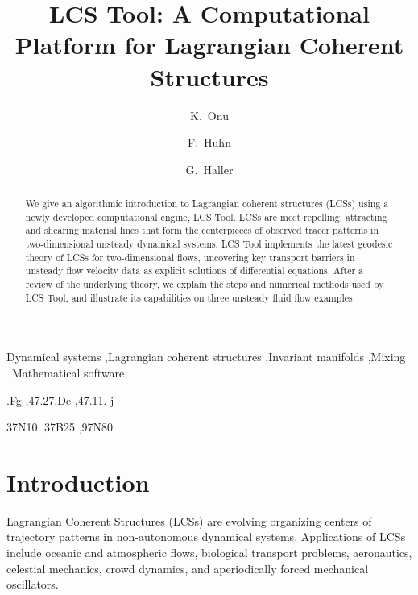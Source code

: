 \documentclass{elsarticle}
\begin{document}
\begin{frontmatter}

\title{LCS Tool: A Computational Platform for Lagrangian Coherent Structures}

\author{K.~Onu}

\author{F.~Huhn}

\author{G.~Haller}


\address{Institute of Mechanical Systems, ETH Zurich, Switzerland}

\begin{abstract}
We give an algorithmic introduction to Lagrangian coherent structures (LCSs) using a newly developed computational engine, LCS Tool. LCSs are most repelling, attracting and shearing material lines that form the centerpieces of observed tracer patterns in two-dimensional unsteady dynamical systems. LCS Tool implements the latest geodesic theory of LCSs for two-dimensional flows, uncovering key transport barriers in unsteady flow velocity data as explicit solutions of differential equations. After a review of the underlying theory, we explain the steps and numerical methods used by LCS Tool, and illustrate its capabilities on three unsteady fluid flow examples.
\end{abstract}

\begin{keyword}
Dynamical systems \sep Lagrangian coherent structures \sep Invariant manifolds \sep Mixing \ Mathematical software

.Fg \sep 47.27.De \sep 47.11.-j

\MSC[2010] 37N10 \sep 37B25 \sep 97N80
\end{keyword}

\end{frontmatter}

\section{Introduction}

Lagrangian Coherent Structures (LCSs) are evolving organizing centers of trajectory patterns in non-autonomous dynamical systems\citep{haller00:_lagran,peacock13:_lagran,haller15:_langr_coher_struc}. Applications of LCSs include oceanic and atmospheric flows\citep{beron-vera13:_objec_agulh,koh02:_hyper}, biological transport problems\citep{wilson09:_lagran_reynol,tallapragada11:_lagran,huhn12:_south_indian_ocean_count_madag}, aeronautics\citep{tang10:_accur_lagran_hong_kong_inter_airpor}, celestial mechanics\citep{gawlik09:_lagran}, crowd dynamics\citep{ali07:_lagran_partic_dynam_approac_crowd}, and aperiodically forced mechanical oscillators\citep{hadjighasem13:_detec_kam}.
\end{document}
